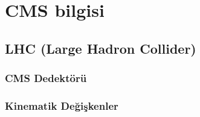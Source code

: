 \chapter{CMS bilgisi}
\section{LHC (Large Hadron Collider)}
\lipsum[2-3]
\subsection{CMS Dedektörü}
\lipsum[2-3]
\subsection{Kinematik Değişkenler}
\lipsum[2-3]


